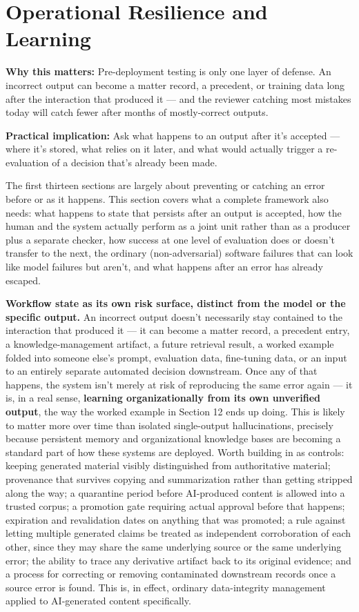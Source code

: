 \section{Operational Resilience and Learning}

\textbf{Why this matters:} Pre-deployment testing is only one layer of defense. An incorrect output can become a matter record, a precedent, or training data long after the interaction that produced it --- and the reviewer catching most mistakes today will catch fewer after months of mostly-correct outputs.

\textbf{Practical implication:} Ask what happens to an output after it's accepted --- where it's stored, what relies on it later, and what would actually trigger a re-evaluation of a decision that's already been made.

The first thirteen sections are largely about preventing or catching an error before or as it happens. This section covers what a complete framework also needs: what happens to state that persists after an output is accepted, how the human and the system actually perform as a joint unit rather than as a producer plus a separate checker, how success at one level of evaluation does or doesn't transfer to the next, the ordinary (non-adversarial) software failures that can look like model failures but aren't, and what happens after an error has already escaped.

\textbf{Workflow state as its own risk surface, distinct from the model or the specific output.} An incorrect output doesn't necessarily stay contained to the interaction that produced it --- it can become a matter record, a precedent entry, a knowledge-management artifact, a future retrieval result, a worked example folded into someone else's prompt, evaluation data, fine-tuning data, or an input to an entirely separate automated decision downstream. Once any of that happens, the system isn't merely at risk of reproducing the same error again --- it is, in a real sense, \textbf{learning organizationally from its own unverified output}, the way the worked example in Section 12 ends up doing. This is likely to matter more over time than isolated single-output hallucinations, precisely because persistent memory and organizational knowledge bases are becoming a standard part of how these systems are deployed. Worth building in as controls: keeping generated material visibly distinguished from authoritative material; provenance that survives copying and summarization rather than getting stripped along the way; a quarantine period before AI-produced content is allowed into a trusted corpus; a promotion gate requiring actual approval before that happens; expiration and revalidation dates on anything that was promoted; a rule against letting multiple generated claims be treated as independent corroboration of each other, since they may share the same underlying source or the same underlying error; the ability to trace any derivative artifact back to its original evidence; and a process for correcting or removing contaminated downstream records once a source error is found. This is, in effect, ordinary data-integrity management applied to AI-generated content specifically.

